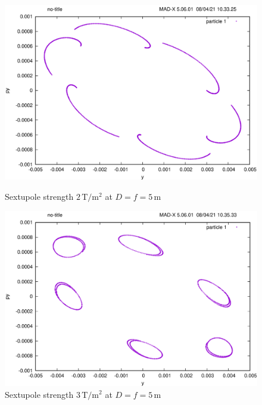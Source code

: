 \begin{figure}[tbp]
    \centering
    \begin{minipage}{0.49\textwidth}
        \includegraphics[width=\textwidth]{../../part1/d5f5sx2.png}
        \caption{Sextupole strength $2\,\mathrm{T/m^2}$ at $D=f=5\,\mathrm{m}$}
        \label{fig:sext2}
    \end{minipage}\hfill
    \begin{minipage}{0.49\textwidth}
        \centering
        \includegraphics[width=\textwidth]{../../part1/d5f5sx3.png}
        \caption{Sextupole strength $3\,\mathrm{T/m^2}$ at $D=f=5\,\mathrm{m}$}
        \label{fig:sext3}
    \end{minipage}
\end{figure}
\clearpage

